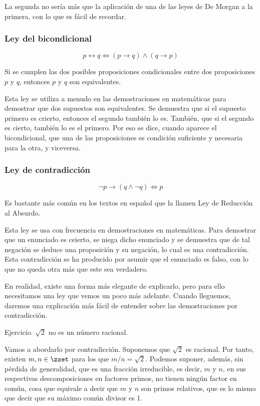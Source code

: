 La segunda no sería más que la aplicación de una de las leyes de De Morgan a
la primera, con lo que es fácil de recordar.




\subsubsection{Ley del bicondicional}

$$ p \leftrightarrow q \iff (p \rightarrow q) \land (q \rightarrow p) $$

Si se cumplen las dos posibles proposiciones condicionales entre dos
proposiciones $p$ y $q$, entonces $p$ y $q$ son equivalentes.

Esta ley se utiliza a menudo en las demostraciones en matemáticas para
demostrar que dos supuestos son equivalentes. Se demuestra que si el
supuesto primero es crierto, entonces el segundo también lo es. También, que
si el segundo es cierto, también lo es el primero. Por eso se dice, cuando
aparece el bicondicional, que una de las proposiciones es condición
suficiente y necesaria para la otra, y viceversa.





\subsubsection{Ley de contradicción}

$$ \neg p \rightarrow (q \land \neg q) \iff p $$

Es bastante más común en los textos en español que la llamen Ley de
Reducción al Absurdo.

Esta ley se usa con frecuencia en demostraciones en matemáticas. Para
demostrar que un enunciado es ceierto, se niega dicho enunciado y se
demuestra que de tal negación se deduce una proposición y su negación, lo
cual es una contradicción. Esta contradicción se ha producido por asumir que
el enunciado es falso, con lo que no queda otra más que este sea verdadero.

En realidad, existe una forma más elegante de explicarlo, pero para ello
necesitamos una ley que vemos un poco más adelante. Cuando lleguemos,
daremos una explicación más fácil de entender sobre las demostraciones por
contradicción.

Ejercicio. $\sqrt{2}$ no es un número racional.


Vamos a abordarlo por contradicción. Suponemos que $\sqrt{2}$ es racional.
Por tanto, existen $m, n \in \zset$ para los que $m/n = \sqrt{2}$. Podemos
suponer, además, sin pérdida de generalidad, que es una fracción
irreducible, es decir, $m$ y $n$, en sus respectivas descomposiciones en
factores primos, no tienen ningún factor en común, cosa que equivale a decir
que $m$ y $n$ son primos relativos, que es lo mismo que decir que su máximo
común divisor es 1.


